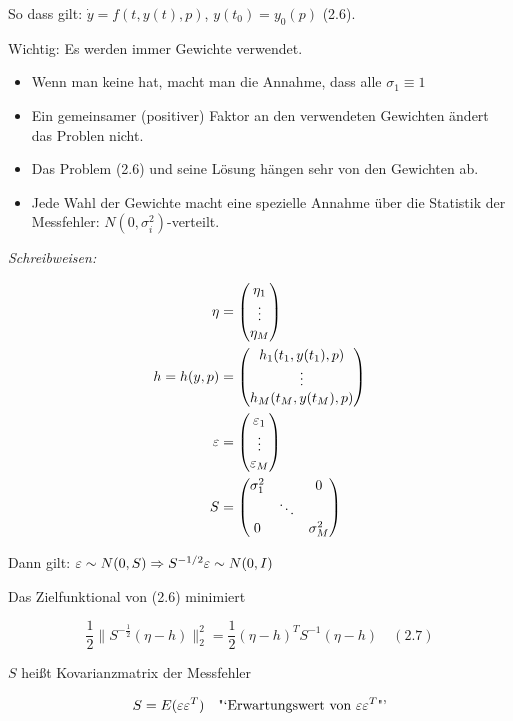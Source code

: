 So dass gilt: $\dot y = f(t,y(t),p)$, $y(t_0) = y_0(p)$ (2.6).

Wichtig: Es werden immer Gewichte verwendet.

\begin{itemize}
\item Wenn man keine hat, macht man die Annahme, dass alle $\sigma_1 \equiv 1$
\item Ein gemeinsamer (positiver) Faktor an den verwendeten Gewichten ändert das Problen nicht.
\item Das Problem (2.6) und seine Lösung hängen sehr von den Gewichten ab.
\item Jede Wahl der Gewichte macht eine spezielle Annahme über die Statistik der Messfehler: $N(0,\sigma_i^2)$-verteilt.
\end{itemize}

\emph{Schreibweisen:}

\begin{align*}
\eta &= \begin{pmatrix} \eta_1 \\ \vdots \\ \eta_M \end{pmatrix} \\
h = h(y,p) &= \begin{pmatrix} h_1(t_1,y(t_1), p) \\ \vdots \\ h_M(t_M, y(t_M),p) \end{pmatrix} \\
\varepsilon &= \begin{pmatrix} \varepsilon_1 \\ \vdots \\ \varepsilon_M \end{pmatrix}\\
S &= \begin{pmatrix} \sigma_1^2 & & 0 \\ & \ddots & \\ 0 & & \sigma_M^2 \end{pmatrix}
\end{align*}

Dann gilt: $\varepsilon \sim N(0,S) \Rightarrow S^{-1/2} \varepsilon \sim N(0,I)$

Das Zielfunktional von (2.6) minimiert

\[ \frac 12 \| S^{-\frac 12} (\eta-h)\|_2^2 = \frac 12 (\eta -h)^T S^{-1} (\eta-h) \quad (2.7) \]

$S$ heißt Kovarianzmatrix der Messfehler

\[S = E (\varepsilon\varepsilon^T) \quad \text{"`Erwartungswert von $\varepsilon\varepsilon^T$"'}\]

